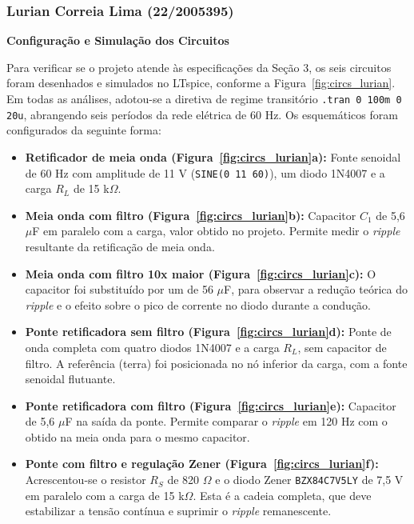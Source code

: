 \documentclass[11pt,a4paper]{article}
\begin{document}
\subsubsection{Lurian Correia Lima (22/2005395)}

\textbf{Configuração e Simulação dos Circuitos}

Para verificar se o projeto atende às especificações da Seção 3, os seis circuitos foram desenhados e simulados no LTspice, conforme a Figura~\ref{fig:circs_lurian}. Em todas as análises, adotou-se a diretiva de regime transitório \texttt{.tran 0 100m 0 20u}, abrangendo seis períodos da rede elétrica de 60 Hz. Os esquemáticos foram configurados da seguinte forma:

\begin{itemize}
    \item \textbf{Retificador de meia onda (Figura~\ref{fig:circs_lurian}a):} Fonte senoidal de 60 Hz com amplitude de 11 V (\texttt{SINE(0 11 60)}), um diodo 1N4007 e a carga $R_L$ de 15 k$\Omega$.

    \item \textbf{Meia onda com filtro (Figura~\ref{fig:circs_lurian}b):} Capacitor $C_1$ de 5,6 $\mu$F em paralelo com a carga, valor obtido no projeto. Permite medir o \textit{ripple} resultante da retificação de meia onda.

    \item \textbf{Meia onda com filtro 10x maior (Figura~\ref{fig:circs_lurian}c):} O capacitor foi substituído por um de 56 $\mu$F, para observar a redução teórica do \textit{ripple} e o efeito sobre o pico de corrente no diodo durante a condução.

    \item \textbf{Ponte retificadora sem filtro (Figura~\ref{fig:circs_lurian}d):} Ponte de onda completa com quatro diodos 1N4007 e a carga $R_L$, sem capacitor de filtro. A referência (terra) foi posicionada no nó inferior da carga, com a fonte senoidal flutuante.

    \item \textbf{Ponte retificadora com filtro (Figura~\ref{fig:circs_lurian}e):} Capacitor de 5,6 $\mu$F na saída da ponte. Permite comparar o \textit{ripple} em 120 Hz com o obtido na meia onda para o mesmo capacitor.

    \item \textbf{Ponte com filtro e regulação Zener (Figura~\ref{fig:circs_lurian}f):} Acrescentou-se o resistor $R_S$ de 820 $\Omega$ e o diodo Zener \texttt{BZX84C7V5LY} de 7,5 V em paralelo com a carga de 15 k$\Omega$. Esta é a cadeia completa, que deve estabilizar a tensão contínua e suprimir o \textit{ripple} remanescente.
\end{itemize}
\end{document}
